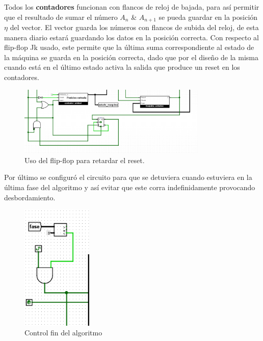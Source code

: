 \documentclass{article}
\begin{document}
Todos los \textbf{contadores} funcionan con flancos de reloj de bajada, para así permitir que el resultado 
de sumar el número $A_n$ \& $A_{n+1}$ se pueda guardar en la posición $\eta$ del vector.
El vector guarda los números con flancos de subida del reloj, de esta manera diario estará guardando los 
datos en la posición correcta.
Con respecto al flip-flop Jk usado, este permite que la última suma correspondiente al estado de la máquina 
se guarda en la posición correcta, dado que por el diseño de la misma cuando está en el último estado activa
la salida que produce un reset en los contadores.
\newpage
\begin{figure}[h] %
    \centering
    \includegraphics[width=0.8\textwidth]{imagenes/ultimo_ciclo.png} %
    \caption{Uso del flip-flop para retardar el reset.} %
    \label{fig:ultimociclo} %
\end{figure}

Por último se configuró el circuito para que se detuviera cuando estuviera en la última fase del algoritmo
y así evitar que este corra indefinidamente provocando desbordamiento.
\begin{figure}[h] %
    \centering
    \includegraphics[width=0.3\textwidth]{imagenes/control.png} %
    \caption{Control fin del algoritmo} %
    \label{fig:control} %
\end{figure}
\end{document}

